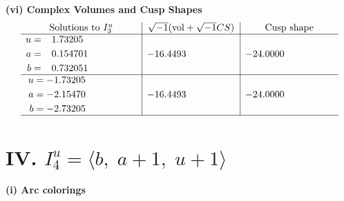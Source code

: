 \documentclass[1p]{elsarticle_modified}
\theoremstyle{definition}
\newcommand{\I}{\sqrt{-1}}
\begin{document}
\newpage\flushleft \textbf{(vi) Complex Volumes and Cusp Shapes}
$$\begin{array}{c|c|c}  
\text{Solutions to }I^u_{3}& \I (\text{vol} + \sqrt{-1}CS) & \text{Cusp shape}\\
 \hline 
\begin{aligned}
u &= \phantom{-}1.73205\phantom{ +0.000000I} \\
a &= \phantom{-}0.154701\phantom{ +0.000000I} \\
b &= \phantom{-}0.732051\phantom{ +0.000000I}\end{aligned}
 & -16.4493\phantom{ +0.000000I} & -24.0000\phantom{ +0.000000I} \\ \hline\begin{aligned}
u &= -1.73205\phantom{ +0.000000I} \\
a &= -2.15470\phantom{ +0.000000I} \\
b &= -2.73205\phantom{ +0.000000I}\end{aligned}
 & -16.4493\phantom{ +0.000000I} & -24.0000\phantom{ +0.000000I}\\
 \hline 
 \end{array}$$\newpage\newpage\renewcommand{\arraystretch}{1}
\centering \section*{IV. $I^u_{4}= \langle b,\;a+1,\;u+1 \rangle$}
\flushleft \textbf{(i) Arc colorings}\\
\end{document}
